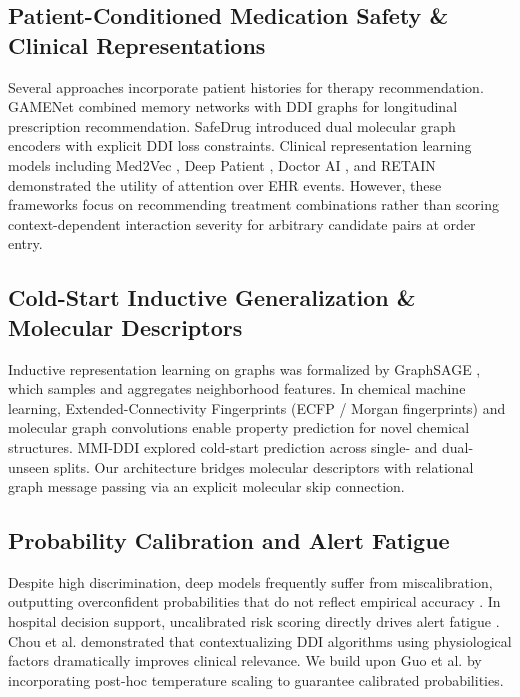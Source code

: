 \documentclass[conference]{IEEEtran}
\begin{document}
\subsection{Patient-Conditioned Medication Safety & Clinical Representations}
Several approaches incorporate patient histories for therapy recommendation. GAMENet \cite{shang2019gamenet} combined memory networks with DDI graphs for longitudinal prescription recommendation. SafeDrug \cite{yang2021safedrug} introduced dual molecular graph encoders with explicit DDI loss constraints. Clinical representation learning models including Med2Vec \cite{choi2016med2vec}, Deep Patient \cite{miotto2016deep}, Doctor AI \cite{choi2016doctor}, and RETAIN \cite{choi2016retain} demonstrated the utility of attention over EHR events. However, these frameworks focus on recommending treatment combinations rather than scoring context-dependent interaction severity for arbitrary candidate pairs at order entry.

\subsection{Cold-Start Inductive Generalization & Molecular Descriptors}
Inductive representation learning on graphs was formalized by GraphSAGE \cite{hamilton2017inductive}, which samples and aggregates neighborhood features. In chemical machine learning, Extended-Connectivity Fingerprints (ECFP / Morgan fingerprints) \cite{rogers2010extended} and molecular graph convolutions \cite{duvenaud2015convolutional, kearnes2016molecular, gilmer2017neural} enable property prediction for novel chemical structures. MMI-DDI \cite{mmi2026multimodal} explored cold-start prediction across single- and dual-unseen splits. Our architecture bridges molecular descriptors with relational graph message passing via an explicit molecular skip connection.

\subsection{Probability Calibration and Alert Fatigue}
Despite high discrimination, deep models frequently suffer from miscalibration, outputting overconfident probabilities that do not reflect empirical accuracy \cite{guo2017calibration}. In hospital decision support, uncalibrated risk scoring directly drives alert fatigue \cite{hussain2019medication, slight2020high, nanji2018medication, topaz2019structured}. Chou et al. \cite{chou2021designing} demonstrated that contextualizing DDI algorithms using physiological factors dramatically improves clinical relevance. We build upon Guo et al. \cite{guo2017calibration} by incorporating post-hoc temperature scaling to guarantee calibrated probabilities.
\end{document}
